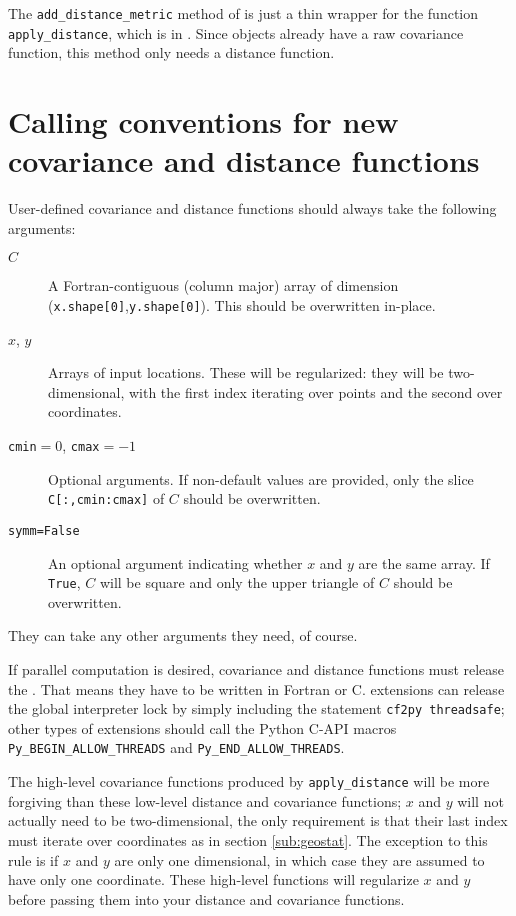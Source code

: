 The \texttt{add_distance_metric} method of  is just a thin wrapper for the function \texttt{apply_distance}, which is in . Since  objects already have a raw covariance function, this method only needs a distance function.



\section{Calling conventions for new covariance and distance functions}
\label{sub:user_ccs}

User-defined covariance and distance functions should always take the following arguments:
\begin{description}
	\item[$C$] A Fortran-contiguous (column major) array of dimension (\texttt{x.shape[0]},\texttt{y.shape[0]}). This should be overwritten in-place.
	\item[$x$, $y$] Arrays of input locations. These will be regularized: they will be two-dimensional, with the first index iterating over points and the second over coordinates.
	\item[\texttt{cmin}$=0$, \texttt{cmax}$=-1$] Optional arguments. If non-default values are provided, only the slice \texttt{C[:,cmin:cmax]} of $C$ should be overwritten.
	\item[\texttt{symm=False}] An optional argument indicating whether $x$ and $y$ are the same array. If \texttt{True}, $C$ will be square and only the upper triangle of $C$ should be overwritten.
\end{description}
They can take any other arguments they need, of course.

If parallel computation is desired, covariance and distance functions must release the . That means they have to be written in Fortran or C.  extensions can release the global interpreter lock by simply including the statement \texttt{cf2py threadsafe}; other types of extensions should call the Python C-API macros \texttt{Py_BEGIN_ALLOW_THREADS} and \texttt{Py_END_ALLOW_THREADS}.

The high-level covariance functions produced by \texttt{apply_distance} will be more forgiving than these low-level distance and covariance functions; $x$ and $y$ will not actually need to be two-dimensional, the only requirement is that their last index must iterate over coordinates as in section \ref{sub:geostat}. The exception to this rule is if $x$ and $y$ are only one dimensional, in which case they are assumed to have only one coordinate. These high-level functions will regularize $x$ and $y$ before passing them into your distance and covariance functions.

